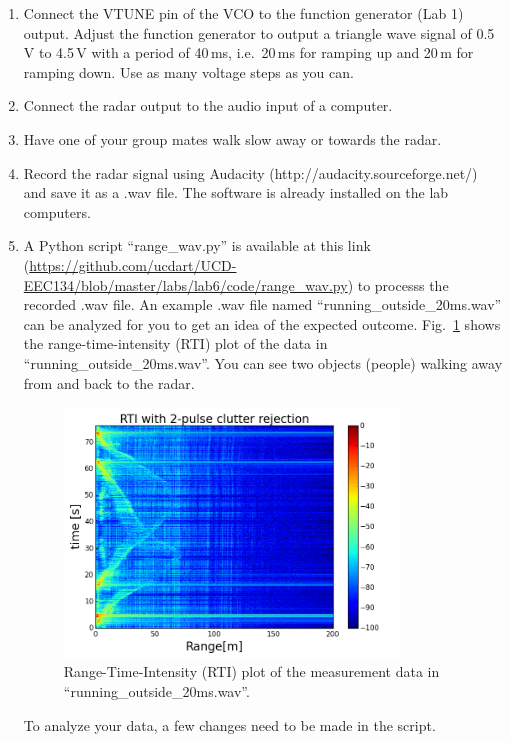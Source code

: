 \documentclass[letterpaper, 11pt]{article}
\begin{document}
\begin{enumerate}
	\item Connect the VTUNE pin of the VCO to the  function generator (Lab 1) output. Adjust the  function generator to output a triangle wave signal of 0.5\,V to 4.5\,V with a period of 40\,ms, i.e.~20\,ms for ramping up and 20\,m for ramping down. Use as many voltage steps as you can. 
	
	\item Connect the radar output to the audio input of a computer. 
	
	\item Have one of your group mates walk slow away or towards the radar. 
	
	\item Record the radar signal using Audacity (http://audacity.sourceforge.net/) and save it as a .wav file. The software is already installed on the lab computers.
	
	\item A Python script ``range\_wav.py'' is available at this link (\url{https://github.com/ucdart/UCD-EEC134/blob/master/labs/lab6/code/range_wav.py}) to processs the recorded .wav file. An example .wav file named ``running\_outside\_20ms.wav'' can be analyzed for you to get an idea of the expected outcome. Fig.~\ref{fig:rti-cr} shows the range-time-intensity (RTI) plot of the data in ``running\_outside\_20ms.wav''. You can see two objects (people) walking away from and back to the radar. 
	
	\begin{figure}[h]
		\centering
		\includegraphics[width=3.5in]{rti-cr.png}
		\caption{Range-Time-Intensity (RTI) plot of the measurement data in ``running\_outside\_20ms.wav''.}
		\label{fig:rti-cr}
	\end{figure} 	
	
	
	To analyze your data, a few changes need to be made in the script.
	

\end{enumerate}
\end{document}
